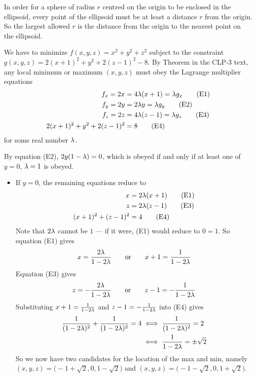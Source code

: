 \begin{solution}
 In order for a sphere of radius $r$ centred on the origin 
to be enclosed in the ellipsoid, every point of the ellipsoid must 
be at least a distance $r$ from the origin. So the largest 
allowed $r$ is the distance from the origin to the nearest point 
on the ellipsoid. 

We have to minimize $f(x,y,z)=x^2+y^2+z^2$ subject to the constraint 
$g(x,y,z) = 2(x+1)^2 + y^2 + 2(z-1)^2 -8$.
By Theorem  in the CLP-3 text, any local minimum
or maximum $(x,y,z)$ must obey the  Lagrange multiplier equations
\begin{align*}
f_x = 2x &=4 \lambda (x+1) = \lambda g_x \tag{E1} \\ 
f_y = 2y &=2 \lambda y = \lambda g_y \tag{E2} \\ 
f_z = 2z &=4 \lambda (z-1) = \lambda g_z \tag{E3} \\ 
2(x+1)^2 + y^2 + 2(z-1)^2 &= 8 \tag{E4}
\end{align*}
for some real number $\lambda$.

By equation (E2), $2y(1-\lambda)=0$, which is
obeyed if and only if at least one of $y=0$, $\lambda=1$ is obeyed.
\begin{itemize}
\item 
If $y=0$, the remaining equations reduce to
\begin{align*}
x &=2 \lambda (x+1)  \tag{E1} \\ 
z &=2 \lambda (z-1) \tag{E3} \\ 
(x+1)^2 + (z-1)^2 &= 4 \tag{E4}
\end{align*}
Note that $2\lambda$ cannot be $1$ --- if it were, (E1) would reduce to $0=1$.
So equation (E1) gives
\begin{align*}
x = \frac{2\lambda}{1-2\lambda}\qquad\text{or}\qquad
x+1 = \frac{1}{1-2\lambda}
\end{align*}
Equation (E3) gives
\begin{align*}
z = -\frac{2\lambda}{1-2\lambda}\qquad\text{or}\qquad
z-1 = -\frac{1}{1-2\lambda}
\end{align*}
Substituting $x+1 = \frac{1}{1-2\lambda}$ and $z-1 = -\frac{1}{1-2\lambda}$ into (E4)
gives
\begin{align*}
\frac{1}{(1-2\lambda)^2} +  \frac{1}{(1-2\lambda)^2} =4
&\iff \frac{1}{(1-2\lambda)^2} = 2 \\
&\iff \frac{1}{1-2\lambda} =\pm\sqrt{2}
\end{align*}
So we now have two candidates for the location of the max and min,
namely 
$(x,y,z) = \big(-1 + \sqrt{2}, 0, 1-\sqrt{2}\big)$ and 
$(x,y,z) = \big(-1 - \sqrt{2}, 0, 1+\sqrt{2}\big)$.


\end{itemize}
\end{solution}
